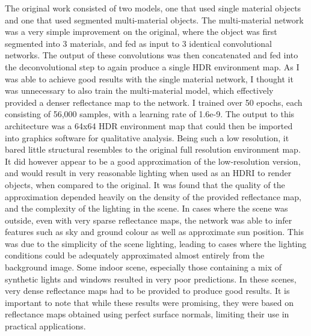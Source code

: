 \documentclass[ %
                    author={Gavin Parker},
                supervisor={Dr. Neill Campbell},
                    degree={MEng},
                     title={Deep Siamese Networks for Illumination Estimation from Stereo Images},
                  subtitle={},
                      type={research},
                      year={2018} ]{dissertation}
\begin{document}
The original work consisted of two models, one that used single material objects and one that used segmented multi-material objects. The multi-material network was a very simple improvement on the original, where the object was first segmented into 3 materials, and fed as input to 3 identical convolutional networks. The output of these convolutions was then concatenated and fed into the deconvolutional step to again produce a single HDR environment map. As I was able to achieve good results with the single material network, I thought it was unnecessary to also train the multi-material model, which effectively provided a denser reflectance map to the network. I trained over 50 epochs, each consisting of 56,000 samples, with a learning rate of 1.6e-9. The output to this architecture was a 64x64 HDR environment map that could then be imported into graphics software for qualitative analysis. Being such a low resolution, it bared little structural resembles to the original full resolution environment map. It did however appear to be a good approximation of the low-resolution version, and would result in very reasonable lighting when used as an HDRI to render objects, when compared to the original.
It was found that the quality of the approximation depended heavily on the density of the provided reflectance map, and the complexity of the lighting in the scene. In cases where the scene was outside, even with very sparse reflectance maps, the network was able to infer features such as sky and ground colour as well as approximate sun position. This was due to the simplicity of the scene lighting, leading to cases where the lighting conditions could be adequately approximated almost entirely from the background image. Some indoor scene, especially those containing a mix of synthetic lights and windows resulted in very poor predictions. In these scenes, very dense reflectance maps had to be provided to produce good results. 
\newline
It is important to note that while these results were promising, they were based on reflectance maps obtained using perfect surface normals, limiting their use in practical applications. 
\end{document}
